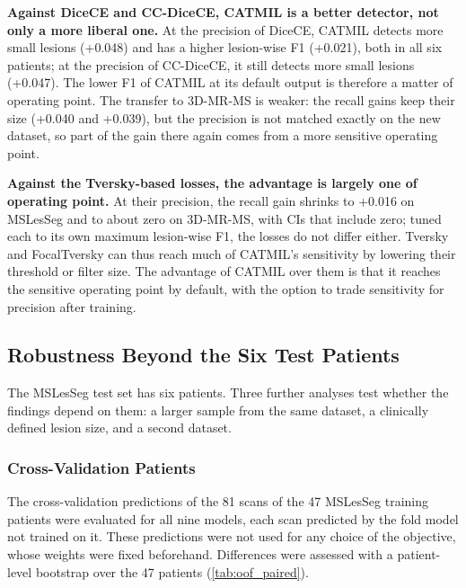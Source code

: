\textbf{Against DiceCE and CC-DiceCE, CATMIL is a better detector, not only
a more liberal one.} At the precision of DiceCE, CATMIL detects more small
lesions (+0.048) and has a higher lesion-wise F1 (+0.021), both in all six
patients; at the precision of CC-DiceCE, it still detects more small
lesions (+0.047). The lower F1 of CATMIL at its default output is
therefore a matter of operating point. The transfer to 3D-MR-MS is weaker:
the recall gains keep their size (+0.040 and +0.039), but the precision is
not matched exactly on the new dataset, so part of the gain there again
comes from a more sensitive operating point.

\textbf{Against the Tversky-based losses, the advantage is largely one of
operating point.} At their precision, the recall gain shrinks to +0.016 on
MSLesSeg and to about zero on 3D-MR-MS, with CIs that include zero; tuned
each to its own maximum lesion-wise F1, the losses do not differ either.
Tversky and FocalTversky can thus reach much of CATMIL's sensitivity by
lowering their threshold or filter size. The advantage of CATMIL over them is
that it reaches the sensitive operating point by default, with the option
to trade sensitivity for precision after training.

\subsection{Robustness Beyond the Six Test Patients}
\label{sec:robustness}

The MSLesSeg test set has six patients. Three further analyses test
whether the findings depend on them: a larger sample from the same
dataset, a clinically defined lesion size, and a second dataset.

\subsubsection{Cross-Validation Patients}
\label{sec:catmil_oof}

The cross-validation predictions of the 81 scans of the 47 MSLesSeg
training patients were evaluated for all nine models, each scan predicted
by the fold model not trained on it. These predictions were not used for
any choice of the objective, whose weights were fixed beforehand.
Differences were assessed with a patient-level bootstrap over the 47
patients (\cref{tab:oof_paired}).

